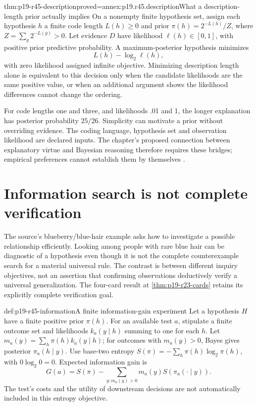 \begin{hbtheorem}{thm:p19-r45-description}{proved=annex:p19.r45.description}{What a description-length prior actually implies}
On a nonempty finite hypothesis set, assign each hypothesis \(h\)
a finite code length \(L(h)\geq0\) and prior
\(\pi(h)=2^{-L(h)}/Z\), where \(Z=\sum_g2^{-L(g)}>0\).
Let evidence \(D\) have likelihood \(\ell(h)\in[0,1]\),
with positive prior predictive probability. A maximum-posterior
hypothesis minimizes
\[
 L(h)-\log_2\ell(h),
\]
with zero likelihood assigned infinite objective. Minimizing description
length alone is equivalent to this decision only when the candidate
likelihoods are the same positive value, or when an additional argument
shows the likelihood differences cannot change the ordering.
\end{hbtheorem}

For code lengths one and three, and likelihoods .01 and 1, the
longer explanation has posterior probability \(25/26\).
Simplicity can motivate a prior without overriding evidence. The
coding language, hypothesis set and observation likelihood are declared
inputs. The chapter's proposed connection between explanatory virtue
and Bayesian reasoning therefore requires these bridges; empirical
preferences cannot establish them by themselves
\cite[pp.~289--290]{ChaterOaksford2021BayesianReasoning}.

\section{Information search is not complete verification}
\label{sec:p19-r45-search}

The source's blueberry/blue-hair example asks how to investigate a
possible relationship efficiently. Looking among people with rare blue
hair can be diagnostic of a hypothesis even though it is not the
complete counterexample search for a material universal rule. The
contrast is between different inquiry objectives, not an assertion that
confirming observations deductively verify a universal generalization.
The four-card result at \cref{thm:p19-r23-cards} retains its explicitly
complete verification goal.

\begin{hbdefinition}{def:p19-r45-information}{A finite information-gain experiment}
Let a hypothesis \(H\) have a finite positive prior \(\pi(h)\).
For an available test \(a\), stipulate a finite outcome set and
likelihoods \(k_a(y\mid h)\) summing to one for each \(h\).
Let \(m_a(y)=\sum_h\pi(h)k_a(y\mid h)\); for outcomes with
\(m_a(y)>0\), Bayes gives posterior \(\pi_a(h\mid y)\).
Use base-two entropy \(S(\pi)=-\sum_h\pi(h)\log_2\pi(h)\),
with \(0\log_2 0=0\). Expected information gain is
\[
 G(a)=S(\pi)-\sum_{y:m_a(y)>0}m_a(y)S(\pi_a(\cdot\mid y)).
\]
The test's costs and the utility of downstream decisions are not
automatically included in this entropy objective.
\end{hbdefinition}

